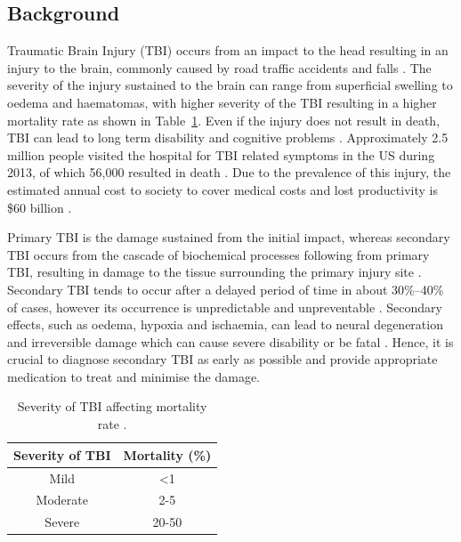 \subsection{Background}
Traumatic Brain Injury (TBI) occurs from an impact to the head resulting in an injury to the brain, commonly caused by road traffic accidents and falls \cite{Langlois2006}. The severity of the injury sustained to the brain can range from superficial swelling to oedema and haematomas, with higher severity of the TBI resulting in a higher mortality rate as shown in Table~\ref{table:severity of TBI}. Even if the injury does not result in death, TBI can lead to long term disability and cognitive problems \cite{WorldHealthOrganisation2006}. Approximately 2.5 million people visited the hospital for TBI related symptoms in the US during 2013, of which 56,000 resulted in death \cite{Taylor2017}. Due to the prevalence of this injury, the estimated annual cost to society to cover medical costs and lost productivity is \$60 billion \cite{Finkelstein2009}. 

Primary TBI is the damage sustained from the initial impact, whereas secondary TBI occurs from the cascade of biochemical processes following from primary TBI, resulting in damage to the tissue surrounding the primary injury site \cite{Norton2008}. Secondary TBI tends to occur after a delayed period of time in about 30\%--40\% of cases, however its occurrence is unpredictable and unpreventable \cite{Pagkalos2017}. Secondary effects, such as oedema, hypoxia and ischaemia, can lead to neural degeneration and irreversible damage which can cause severe disability or be fatal \cite{Murthy2005}. Hence, it is crucial to diagnose secondary TBI as early as possible and provide appropriate medication to treat and minimise the damage.

\begin{table}[H]
\centering
\begin{tabular}{||c c||} 
 \hline
 Severity of TBI & Mortality (\%) \\ [0.5ex] 
 \hline\hline
 Mild & \textless 1 \\ 
 Moderate & 2-5 \\
 Severe & 20-50 \\
 \hline
\end{tabular}
\caption{Severity of TBI affecting mortality rate \cite{WorldHealthOrganisation2006}.}
\label{table:severity of TBI}
\end{table}



